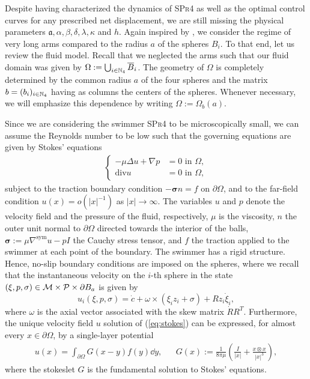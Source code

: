 Despite having characterized the dynamics of \textsc{SPr4} as well as the optimal control curves for any prescribed net displacement, we are still missing the physical parameters $\mathfrak{a}, \alpha, \beta, \delta, \lambda, \kappa$ and $h$. Again inspired by \cite{Alouges2017}, we consider the regime of very long arms compared to the radius $a$ of the spheres $B_i$. To that end, let us review the fluid model. Recall that we neglected the arms such that our fluid domain was given by $\Omega := \bigcup_{i \in \mathbb{N}_4} \overline{B}_i$. The geometry of $\Omega$ is completely determined by the common radius $a$ of the four spheres and the matrix $b = (b_i)_{i \in \mathbb{N}_4}$ having as columns the centers of the spheres. Whenever necessary, we will emphasize this dependence by writing $\Omega := \Omega_b(a)$.

Since we are considering the swimmer \textsc{SPr4} to be microscopically small, we can assume the Reynolds number to be low such that the governing equations are given by Stokes' equations
\begin{align}
\label{eq:stokes}
\begin{cases}
- \mu \Delta u + \nabla p &= 0 \text{ in } \Omega,\\
\mathrm{div} u  &= 0  \text{ in } \Omega,
\end{cases}
\end{align}
subject to the traction boundary condition $- \boldsymbol\sigma n = f$ on $\partial \Omega$, and to the far-field condition $u(x) = o(|x|^{-1})$ as $|x| \to \infty$. The variables $u$ and $p$ denote the velocity field and the pressure of the fluid, respectively, $\mu$ is the viscosity, $n$ the outer unit normal to $\partial \Omega$ directed towards the interior of the balls, $\boldsymbol \sigma := \mu \nabla^{\mathrm{sym}}u - p I$ the Cauchy stress tensor, and $f$ the traction applied to the swimmer at each point of the boundary. The swimmer has a rigid structure. Hence, no-slip boundary conditions are imposed on the spheres, where we recall that the instantaneous velocity on the $i$-th sphere in the state $(\xi, p, \sigma) \in \mathcal{M} \times \mathcal{P} \times \partial B_a $ is given by
\begin{equation}
	u_i(\xi, p, \sigma) = \dot{c} + \omega \times (\xi_i z_i + \sigma) + R z_i \dot{\xi}_i,
\end{equation}
where $\omega$ is the axial vector associated with the skew matrix $\dot{R} R^T$. Furthermore, the unique velocity field $u$ solution of (\ref{eq:stokes}) can be expressed, for almost every $x \in \partial \Omega$, by a single-layer potential
\begin{align}
\label{eq:single_layer}
	u(x) = \int_{\partial \Omega} G(x - y) f(y) \dd y, & & G(x) := \frac{1}{8 \pi \mu} \left ( \frac{I}{|x|} + \frac{x \otimes x}{|x|^3} \right ),
\end{align}
where the stokeslet $G$ is the fundamental solution to Stokes' equations.

